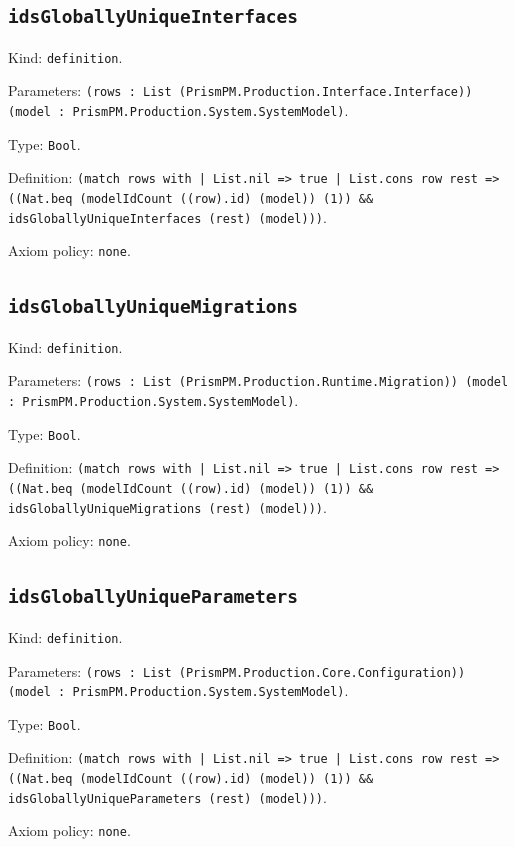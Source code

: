 \documentclass[11pt]{article}
\begin{document}
\subsection*{\texttt{idsGloballyUniqueInterfaces}}
\noindent Kind: \texttt{definition}.\par
\noindent Parameters: \texttt{(rows : List (PrismPM.Production.Interface.Interface)) (model : PrismPM.Production.System.SystemModel)}.\par
\noindent Type: \texttt{Bool}.\par
\noindent Definition: \texttt{(match rows with | List.nil => true | List.cons row rest => ((Nat.beq (modelIdCount ((row).id) (model)) (1)) \&\& idsGloballyUniqueInterfaces (rest) (model)))}.\par
\noindent Axiom policy: \texttt{none}.\par
\subsection*{\texttt{idsGloballyUniqueMigrations}}
\noindent Kind: \texttt{definition}.\par
\noindent Parameters: \texttt{(rows : List (PrismPM.Production.Runtime.Migration)) (model : PrismPM.Production.System.SystemModel)}.\par
\noindent Type: \texttt{Bool}.\par
\noindent Definition: \texttt{(match rows with | List.nil => true | List.cons row rest => ((Nat.beq (modelIdCount ((row).id) (model)) (1)) \&\& idsGloballyUniqueMigrations (rest) (model)))}.\par
\noindent Axiom policy: \texttt{none}.\par
\subsection*{\texttt{idsGloballyUniqueParameters}}
\noindent Kind: \texttt{definition}.\par
\noindent Parameters: \texttt{(rows : List (PrismPM.Production.Core.Configuration)) (model : PrismPM.Production.System.SystemModel)}.\par
\noindent Type: \texttt{Bool}.\par
\noindent Definition: \texttt{(match rows with | List.nil => true | List.cons row rest => ((Nat.beq (modelIdCount ((row).id) (model)) (1)) \&\& idsGloballyUniqueParameters (rest) (model)))}.\par
\noindent Axiom policy: \texttt{none}.\par
\end{document}
